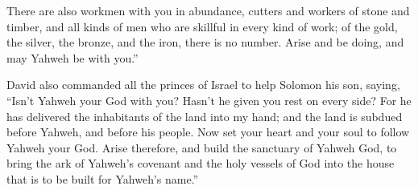 {There are also workmen with you in abundance, cutters and workers of stone and timber, and all kinds of men who are skillful in every kind of work;
of the gold, the silver, the bronze, and the iron, there is no number. Arise and be doing, and may Yahweh be with you.”
\par }{\PP {}David also commanded all the princes of Israel to help Solomon his son, saying,
“Isn’t Yahweh your God with you? Hasn’t he given you rest on every side? For he has delivered the inhabitants of the land into my hand; and the land is subdued before Yahweh, and before his people.
Now set your heart and your soul to follow Yahweh your God. Arise therefore, and build the sanctuary of Yahweh God, to bring the ark of Yahweh’s covenant and the holy vessels of God into the house that is to be built for Yahweh’s name.”

}
